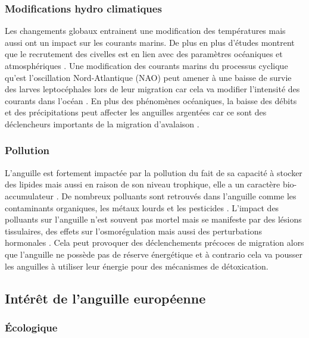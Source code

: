 \documentclass[11pt,titlepage,twoside]{article}\usepackage[]{graphicx}\usepackage[table]{xcolor}
\begin{document}
\subsubsection{Modifications hydro climatiques}

Les changements globaux entrainent une modification des températures mais aussi ont un impact sur les courants marins. De plus en plus d’études montrent que le recrutement des civelles est en lien avec des paramètres océaniques et atmosphériques \citep{bonhommeau_impact_2008, durif_influence_2010}. Une modification des courants marins du processus cyclique qu’est l’oscillation Nord-Atlantique (NAO) peut amener à une baisse de survie des larves leptocéphales lors de leur migration car cela va modifier l’intensité des courants dans l’océan \citep{durif_influence_2010}. En plus des phénomènes océaniques, la baisse des débits et des précipitations peut affecter les anguilles argentées car ce sont des déclencheurs importants de la migration d’avalaison \citep{bruijs_silver_2009}.

\subsubsection{Pollution}

L’anguille est fortement impactée par la pollution du fait de sa capacité à stocker des lipides mais aussi en raison de son niveau trophique, elle a un caractère bio-accumulateur \citep{brusle_anguille_1994,robinet_sublethal_2002}. De nombreux polluants sont retrouvés dans l’anguille comme les contaminants organiques, les métaux lourds et les pesticides \citep{bilau_probabilistic_2007,maes_catadromous_2005,couillard_correlation_2011}. L’impact des polluants sur l’anguille n’est souvent pas mortel mais se manifeste par des lésions tissulaires, des effets sur l’osmorégulation mais aussi des perturbations hormonales \citep{couillard_correlation_2011}. Cela peut provoquer des déclenchements précoces de migration alors que l’anguille ne possède pas de réserve énergétique et à contrario cela va pousser les anguilles à utiliser leur énergie pour des mécanismes de détoxication.


\subsection{Intérêt de l’anguille européenne }

\subsubsection{Écologique }
\end{document}
